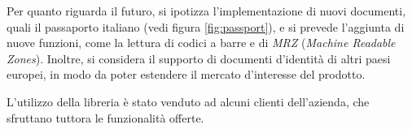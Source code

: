Per quanto riguarda il futuro, si ipotizza l'implementazione di nuovi documenti, quali il passaporto italiano (vedi figura \ref{fig:passport}), e si prevede l'aggiunta di nuove funzioni, come la lettura di codici a barre e di \textit{MRZ} (\textit{Machine Readable Zones}). Inoltre, si considera il supporto di documenti d'identit\`a di altri paesi europei, in modo da poter estendere il mercato d'interesse del prodotto.\par
L'utilizzo della libreria \`e stato venduto ad alcuni clienti dell'azienda, che sfruttano tuttora le funzionalit\`a offerte.
